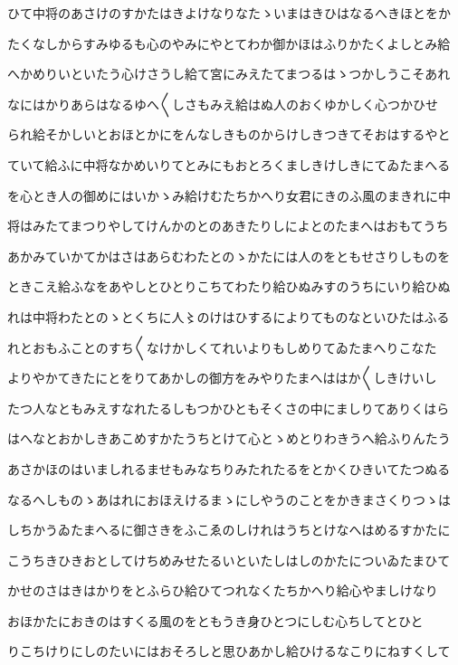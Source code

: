 \documentclass[a4paper,11pt,landscape]{ltjtarticle}
\begin{document}
ひて中将のあさけのすかたはきよけなりなたゝいまはきひはなるへきほとをか
\par\medskip
たくなしからすみゆるも心のやみにやとてわか御かほはふりかたくよしとみ給
\par\medskip
へかめりいといたう心けさうし給て宮にみえたてまつるはゝつかしうこそあれ
\par\medskip
なにはかりあらはなるゆへ〱しさもみえ給はぬ人のおくゆかしく心つかひせ
\par\medskip
られ給そかしいとおほとかにをんなしきものからけしきつきてそおはするやと
\par\medskip
ていて給ふに中将なかめいりてとみにもおとろくましきけしきにてゐたまへる
\par\medskip
を心とき人の御めにはいかゝみ給けむたちかへり女君にきのふ風のまきれに中
\par\medskip
将はみたてまつりやしてけんかのとのあきたりしによとのたまへはおもてうち
\par\medskip
あかみていかてかはさはあらむわたとのゝかたには人のをともせさりしものを
\par\medskip
ときこえ給ふなをあやしとひとりこちてわたり給ひぬみすのうちにいり給ひぬ
\par\medskip
れは中将わたとのゝとくちに人〻のけはひするによりてものなといひたはふる
\par\medskip
れとおもふことのすち〱なけかしくてれいよりもしめりてゐたまへりこなた
\par\medskip
よりやかてきたにとをりてあかしの御方をみやりたまへははか〱しきけいし
\par\medskip
たつ人なともみえすなれたるしもつかひともそくさの中にましりてありくはら
\par\medskip
はへなとおかしきあこめすかたうちとけて心とゝめとりわきうへ給ふりんたう
\par\medskip
あさかほのはいましれるませもみなちりみたれたるをとかくひきいてたつぬる
\par\medskip
なるへしものゝあはれにおほえけるまゝにしやうのことをかきまさくりつゝは
\par\medskip
しちかうゐたまへるに御さきをふこゑのしけれはうちとけなへはめるすかたに
\par\medskip
こうちきひきおとしてけちめみせたるいといたしはしのかたについゐたまひて
\par\medskip
かせのさはきはかりをとふらひ給ひてつれなくたちかへり給心やましけなり
\par\medskip
おほかたにおきのはすくる風のをともうき身ひとつにしむ心ちしてとひと
\par\medskip
りこちけりにしのたいにはおそろしと思ひあかし給ひけるなこりにねすくして
\end{document}
